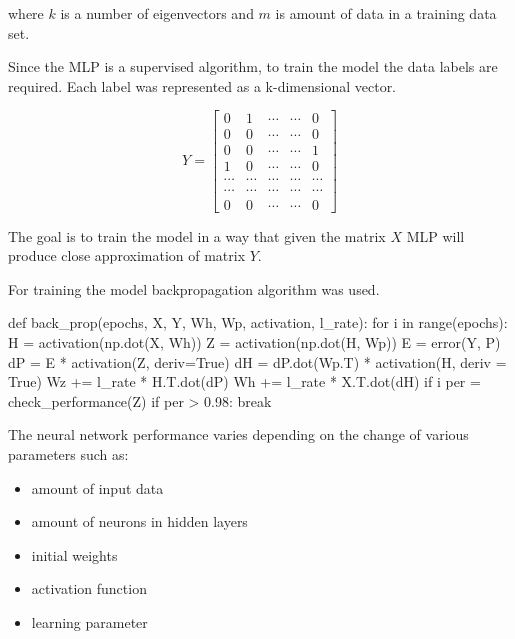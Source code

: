 where $k$ is a number of eigenvectors and $m$ is amount of data in a training data set.

Since the MLP is a supervised algorithm, to train the model the data labels are required. Each label was represented as a k-dimensional vector.

\begin{equation}
Y =
\left[
\begin{matrix}
0 & 1 & \cdots & \cdots & 0\\
0 & 0 & \cdots & \cdots & 0\\
0 & 0 & \cdots & \cdots & 1\\
1 & 0 & \cdots & \cdots & 0\\
\cdots & \cdots & \cdots & \cdots & \cdots\\
\cdots & \cdots & \cdots & \cdots & \cdots\\
0 & 0 & \cdots & \cdots & 0
\end{matrix}
\right]
\end{equation}

The goal is to train the model in a way that given the matrix $X$ MLP will produce close approximation of matrix $Y$. 

For training the model backpropagation algorithm was used. 
\\
\begin{python}
def back_prop(epochs, X, Y, Wh, Wp, activation, l_rate):
    for i in range(epochs):
        H = activation(np.dot(X, Wh))  
        Z = activation(np.dot(H, Wp)) 
        E = error(Y, P)
        dP = E * activation(Z, deriv=True) 
        dH = dP.dot(Wp.T) * activation(H, deriv = True)  
        Wz += l_rate * H.T.dot(dP)  
        Wh += l_rate * X.T.dot(dH)  
        if i %
            per = check_performance(Z)
            if per > 0.98:
                break
\end{python}


The neural network performance varies depending on the change of various parameters such as:

\begin{itemize}
\itemsep0em 
\item amount of input data
\item amount of neurons in hidden layers
\item initial weights
\item activation function
\item learning parameter
\end{itemize}

